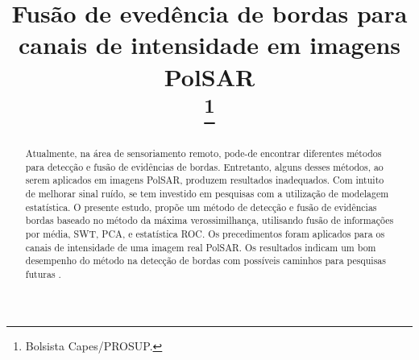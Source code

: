 \documentclass[conference]{IEEEtran}
\begin{document}
\title{Fusão de evedência de bordas para canais de intensidade em imagens PolSAR\\
\thanks{Bolsista Capes/PROSUP.}
}

\author{
\and
{}
\and
{}
}

\maketitle

\begin{abstract}
Atualmente, na área de sensoriamento remoto, pode-de encontrar diferentes métodos para detecção e fusão de evidências de bordas. Entretanto, alguns desses  métodos, ao serem aplicados em imagens PolSAR, produzem resultados inadequados. Com intuito de melhorar sinal ruído, se tem investido em pesquisas com a utilização de modelagem estatística. O presente estudo, propõe um método de detecção e fusão de evidências bordas baseado no método da máxima verossimilhança, utilisando fusão de informações por média, SWT, PCA, e estatística ROC. Os precedimentos foram aplicados para os canais de intensidade de uma imagem real PolSAR. Os resultados indicam um bom desempenho do método na detecção de bordas com possíveis caminhos para pesquisas futuras .
\end{abstract}
\end{document}
